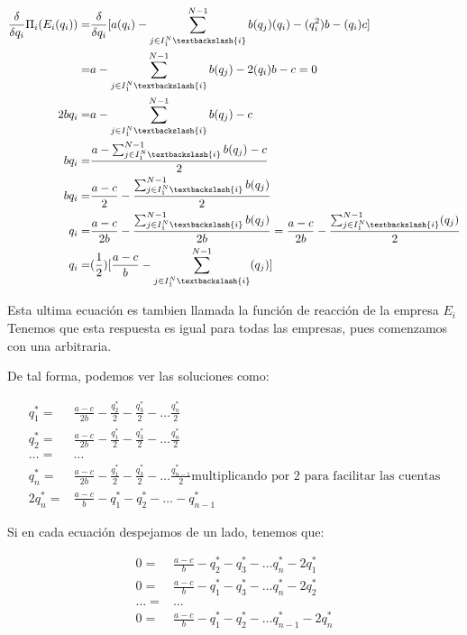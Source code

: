 \documentclass{homework}
\begin{document}
\begin{equation}
\begin{split}
    \frac{\delta}{\delta q_i} \Pi_i(E_i(q_i))  =& \frac{\delta}{\delta q_i}[a(q_i) -\sum_{j \in I_{1}^{N}\textbackslash \{ i\} }^{N-1}b(q_j)(q_i) - (q_{i}^{2})b - (q_i)c ] \\
    =& a-\sum_{j \in I_{1}^{N}\textbackslash \{ i\} }^{N-1}b(q_j) - 2(q_{i})b - c = 0 \\
    2bq_i =& a-\sum_{j \in I_{1}^{N}\textbackslash \{ i\} }^{N-1}b(q_j) - c \\
    bq_i =& \frac{a-\sum_{j \in I_{1}^{N}\textbackslash \{ i\} }^{N-1}b(q_j) - c}{2} \\
    bq_i =&   \frac{a-c}{2} - \frac{\sum_{j \in I_{1}^{N}\textbackslash \{ i\} }^{N-1}b(q_j)}{2} \\
    q_i =& \frac{a-c}{2b} - \frac{\sum_{j \in I_{1}^{N}\textbackslash \{ i\} }^{N-1}b(q_j)}{2b} = \frac{a-c}{2b} - \frac{\sum_{j \in I_{1}^{N}\textbackslash \{ i\} }^{N-1}(q_j)}{2} \\
    q_i =& (\frac{1}{2})[\frac{a-c}{b}-\sum_{j \in I_{1}^{N}\textbackslash \{ i\} }^{N-1}(q_j)]
\end{split}
\end{equation}


Esta ultima ecuación es tambien llamada la función de reacción de la empresa $E_i$
Tenemos que esta respuesta es igual para todas las empresas, pues comenzamos con una arbitraria.

De tal forma, podemos ver las soluciones como:

\begin{equation}
\begin{split}
    q_1^* =& \frac{a-c}{2b} - \frac{q_2^*}{2} - \frac{q_3^*}{2} - \dots \frac{q_n^*}{2} \\
    q_2^* =& \frac{a-c}{2b} - \frac{q_1^*}{2} - \frac{q_3^*}{2} - \dots \frac{q_n^*}{2} \\
    \dots =& \dots \\
    q_n^* =& \frac{a-c}{2b} - \frac{q_1^*}{2} - \frac{q_3^*}{2} - \dots \frac{q_{n-1}^*}{2} \text{multiplicando por 2 para facilitar las cuentas} \\
    2q_n^* =& \frac{a-c}{b} - q_1^* -q_2^* - \dots - q_{n-1}^*
\end{split}
\end{equation}

Si en cada ecuación despejamos de un lado, tenemos que:

\begin{equation}
\begin{split}
    0 =& \frac{a-c}{b} - q_2^* - q_3^* - \dots q_n^* - 2q_1^*\\
    0 =& \frac{a-c}{b} - q_1^*- q_3^* - \dots q_n^* - 2q_2^* \\
    \dots =& \dots \\
    0 =& \frac{a-c}{b} - q_1^* - q_2^* - \dots q_{n-1}^* - 2q_n^*\\
\end{split}
\end{equation}
\end{document}
